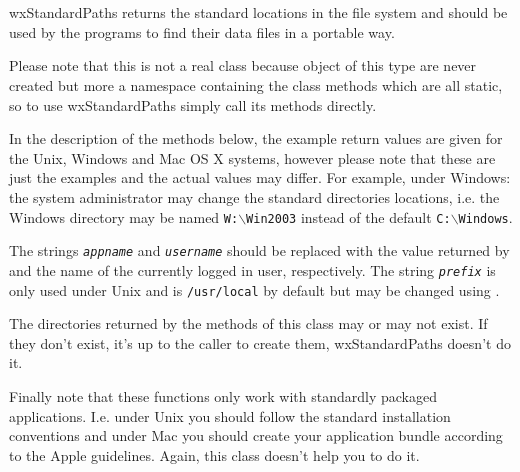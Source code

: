 
\section{}\label{wxstandardpaths}

wxStandardPaths returns the standard locations in the file system and should be
used by the programs to find their data files in a portable way.

Please note that this is not a real class because object of this type are never
created but more a namespace containing the class methods which are all static,
so to use wxStandardPaths simply call its methods directly.

In the description of the methods below, the example return values are given
for the Unix, Windows and Mac OS X systems, however please note that these are
just the examples and the actual values may differ. For example, under Windows:
the system administrator may change the standard directories locations, i.e.
the Windows directory may be named \texttt{W:$\backslash$Win2003} instead of
the default \texttt{C:$\backslash$Windows}.

The strings \texttt{\textit{appname}} and \texttt{\textit{username}} should be
replaced with the value returned by  
and the name of the currently logged in user, respectively. The string 
\texttt{\textit{prefix}} is only used under Unix and is \texttt{/usr/local} by
default but may be changed using .

The directories returned by the methods of this class may or may not exist. If
they don't exist, it's up to the caller to create them, wxStandardPaths doesn't
do it.

Finally note that these functions only work with standardly packaged
applications. I.e. under Unix you should follow the standard installation
conventions and under Mac you should create your application bundle according
to the Apple guidelines. Again, this class doesn't help you to do it.

